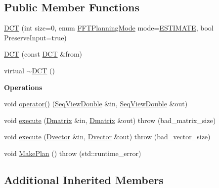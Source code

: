 \subsection*{Public Member Functions}
\begin{DoxyCompactItemize}
\item 
\hyperlink{classtsa_1_1_d_c_t_af005a7dbab2f6c40e82f54a0bb55a7ec}{D\+CT} (int size=0, enum \hyperlink{namespacetsa_a217e07ef78939f88b22c8428ac96b1ae}{F\+F\+T\+Planning\+Mode} mode=\hyperlink{namespacetsa_a217e07ef78939f88b22c8428ac96b1aea2762be66fb6f3e4772c7f4cc162b9750}{E\+S\+T\+I\+M\+A\+TE}, bool Preserve\+Input=true)
\item 
\hyperlink{classtsa_1_1_d_c_t_abff7d5fe3f8f732db5963e2dfb22dfa4}{D\+CT} (const \hyperlink{classtsa_1_1_d_c_t}{D\+CT} \&from)
\item 
virtual \hyperlink{classtsa_1_1_d_c_t_a014240a8695d47e1f8191d108e88032f}{$\sim$\+D\+CT} ()
\end{DoxyCompactItemize}
\begin{Indent}\textbf{ Operations}\par
\begin{DoxyCompactItemize}
\item 
void \hyperlink{classtsa_1_1_d_c_t_a594c2f0240e0b7b4d736c498732b5bfb}{operator()} (\hyperlink{namespacetsa_ac599574bcc094eda25613724b8f3ca9e}{Seq\+View\+Double} \&in, \hyperlink{namespacetsa_ac599574bcc094eda25613724b8f3ca9e}{Seq\+View\+Double} \&out)
\item 
void \hyperlink{classtsa_1_1_d_c_t_ad659700e6288deb47359fb3797ecae21}{execute} (\hyperlink{namespacetsa_ad260cd21c1891c4ed391fe788569aba4}{Dmatrix} \&in, \hyperlink{namespacetsa_ad260cd21c1891c4ed391fe788569aba4}{Dmatrix} \&out)  throw (bad\+\_\+matrix\+\_\+size)
\item 
void \hyperlink{classtsa_1_1_d_c_t_adcdd78df5654afdc798748671a7b121d}{execute} (\hyperlink{namespacetsa_a8900fb03d849baf447a1a0efe2561fb2}{Dvector} \&in, \hyperlink{namespacetsa_a8900fb03d849baf447a1a0efe2561fb2}{Dvector} \&out)  throw (bad\+\_\+vector\+\_\+size)
\item 
void \hyperlink{classtsa_1_1_d_c_t_a2d24c07a7b3f96b16056eee1ab9bad89}{Make\+Plan} ()  throw (std\+::runtime\+\_\+error)
\end{DoxyCompactItemize}
\end{Indent}
\subsection*{Additional Inherited Members}


